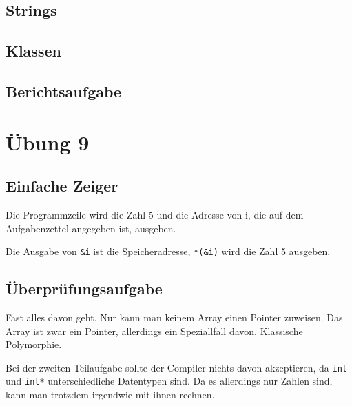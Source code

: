 \section{Strings}


\section{Klassen}


\section{Berichtsaufgabe}


\chapter{Übung 9}

\section{Einfache Zeiger}

Die Programmzeile wird die Zahl 5 und die Adresse von i, die auf dem Aufgabenzettel angegeben ist, ausgeben.

Die Ausgabe von \verb#&i# ist die Speicheradresse, \verb#*(&i)# wird die Zahl 5 ausgeben.

\section{Überprüfungsaufgabe}

Fast alles davon geht. Nur kann man keinem Array einen Pointer zuweisen. Das Array ist zwar ein Pointer, allerdings ein Speziallfall davon. Klassische Polymorphie.

Bei der zweiten Teilaufgabe sollte der Compiler nichts davon akzeptieren, da \texttt{int} und \texttt{int*} unterschiedliche Datentypen sind. Da es allerdings nur Zahlen sind, kann man trotzdem irgendwie mit ihnen rechnen.

